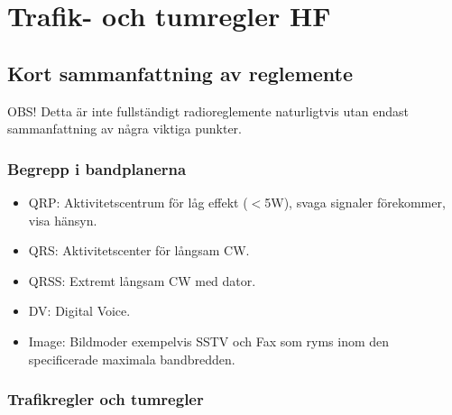 \clearpage

\section{Trafik- och tumregler HF}
\subsection{Kort sammanfattning av reglemente}

OBS! Detta är inte fullständigt radioreglemente naturligtvis utan endast sammanfattning av några viktiga punkter.

\subsubsection{Begrepp i bandplanerna}

\begin{itemize}
\item QRP: Aktivitetscentrum för låg effekt ($<$5W), svaga signaler förekommer, visa hänsyn.
\item QRS: Aktivitetscenter för långsam CW.
\item QRSS: Extremt långsam CW med dator.
\item DV: Digital Voice.
\item Image: Bildmoder exempelvis SSTV och Fax som ryms inom den specificerade maximala bandbredden.
\end{itemize}

\subsubsection{Trafikregler och tumregler}

